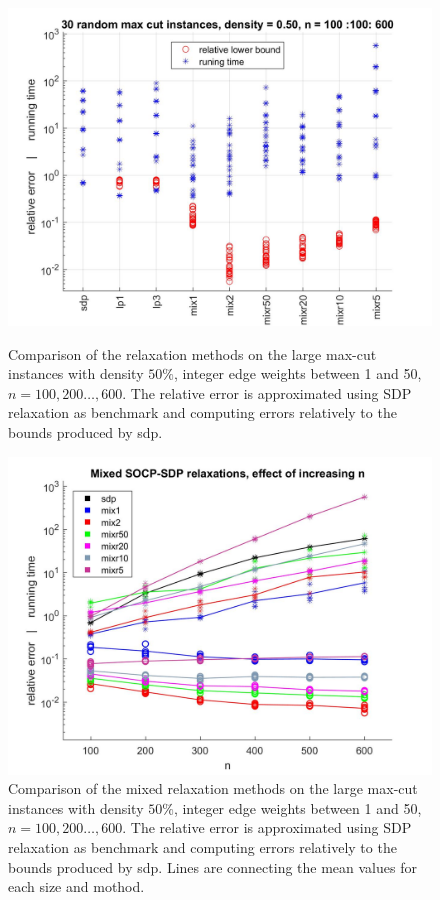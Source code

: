 \documentclass[12pt]{book}
\theoremstyle{definition}
\begin{document}
\begin{center}
\begin{figure}
\includegraphics[scale=0.27]{img/comp3.jpg}
\caption[Comparison of relaxations - large, dense instances of max-cut 1]{Comparison of the relaxation methods on the large max-cut instances with density  $50\%$, integer edge weights between 1 and 50, $n=100,200\dots ,600$. The relative error is approximated using SDP relaxation as benchmark and computing errors relatively to the bounds produced by sdp.} 
\label{comp3}

\includegraphics[scale=0.27]{img/comp_mix_n_100-600.jpg}
\caption[Comparison of relaxations - large, dense instances of max-cut 2]{Comparison of the mixed relaxation methods on the large max-cut instances with density  $50\%$, integer edge weights between 1 and 50, $n=100,200\dots ,600$. The relative error is approximated using SDP relaxation as benchmark and computing errors relatively to the bounds produced by sdp. Lines are connecting the mean values for each size and mothod.} 
\label{comp3size}
\end{figure}
\end{center}
\end{document}
